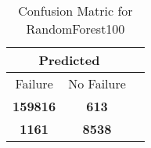\begin{table}[] 
\caption{Confusion Matric for RandomForest100} 
\label{Table: Prediction Accuracy-NoneRandomForest10085.0EKF-ignoreReflection-Reflection} 
\centering 
\begin{tabular} 
 {@{}ccc@{}} 
\toprule 
\multicolumn{2}{c}{\textbf{Predicted}}
 \\ \midrule 
\multicolumn{1}{|c|}{Failure} & 
\multicolumn{1}{c|}{No Failure}
 \\ \midrule 
\multicolumn{1}{|c|}{\color{green}\textbf{159816}} & 
\multicolumn{1}{c|}{\color{red}\textbf{613}}
 \\ \midrule 
\multicolumn{1}{|c|}{\color{red}\textbf{1161}} & 
\multicolumn{1}{c|}{\color{green}\textbf{8538}}
 \\ \bottomrule 
\end{tabular} 
\end{table} 
